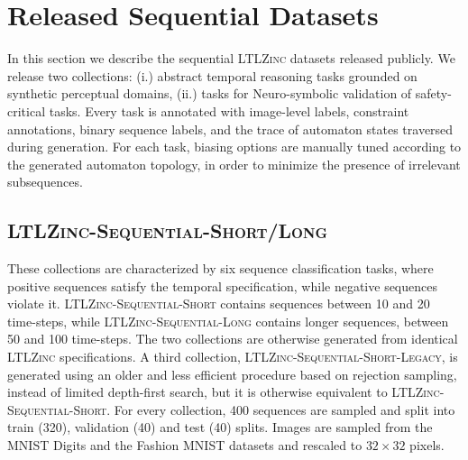 \section{Released Sequential Datasets}\label{ltlzinc:sec:seqexp}
In this section we describe the sequential \textsc{LTLZinc} datasets released publicly. We release two collections: (i.) abstract temporal reasoning tasks grounded on synthetic perceptual domains, (ii.) tasks for Neuro-symbolic validation of safety-critical tasks. Every task is annotated with image-level labels, constraint annotations, binary sequence labels, and the trace of automaton states traversed during generation. For each task, biasing options are manually tuned according to the generated automaton topology, in order to minimize the presence of irrelevant subsequences.

\subsection{\textsc{LTLZinc-Sequential-Short/Long}} These collections are characterized by six sequence classification tasks, where positive sequences satisfy the temporal specification, while negative sequences violate it. \textsc{LTLZinc-Sequential-Short} contains sequences between 10 and 20 time-steps, while \textsc{LTLZinc-Sequential-Long} contains longer sequences, between 50 and 100 time-steps. The two collections are otherwise generated from identical \textsc{LTLZinc} specifications. A third collection, \textsc{LTLZinc-Sequential-Short-Legacy}, is generated using an older and less efficient procedure based on rejection sampling, instead of limited depth-first search, but it is otherwise equivalent to \textsc{LTLZinc-Sequential-Short}.
For every collection, 400 sequences are sampled and split into train (320), validation (40) and test (40) splits.
Images are sampled from the MNIST Digits and the Fashion MNIST datasets and rescaled to $32 \times 32$ pixels.

